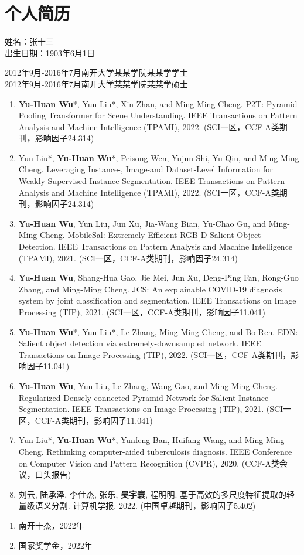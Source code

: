 

\chapter*{个人简历}

\noindent 姓名：张十三\\
出生日期：1903年6月1日\\



\noindent
2012年9月-2016年7月\quad 南开大学\quad 某某学院\quad 某某学\quad 学士 \\ 
2012年9月-2016年7月\quad 南开大学\quad 某某学院\quad 某某学\quad 硕士 \\

\begin{enumerate}
	\item \textbf{Yu-Huan Wu}*, Yun Liu*, Xin Zhan, and Ming-Ming Cheng. P2T: Pyramid Pooling Transformer for Scene Understanding. IEEE Transactions on Pattern Analysis and Machine Intelligence (TPAMI), 2022.  (SCI一区，CCF-A类期刊，影响因子24.314)
	\item Yun Liu*, \textbf{Yu-Huan Wu}*, Peisong Wen, Yujun Shi, Yu Qiu, and Ming-Ming Cheng. Leveraging Instance-, Image-and Dataset-Level Information for Weakly Supervised Instance Segmentation. IEEE Transactions on Pattern Analysis and Machine Intelligence (TPAMI), 2022. (SCI一区，CCF-A类期刊，影响因子24.314)
	\item \textbf{Yu-Huan Wu}, Yun Liu, Jun Xu, Jia-Wang Bian, Yu-Chao Gu, and Ming-Ming Cheng. MobileSal: Extremely Efficient RGB-D Salient Object Detection. IEEE Transactions on Pattern Analysis and Machine Intelligence (TPAMI), 2021.  (SCI一区，CCF-A类期刊，影响因子24.314)
	\item \textbf{Yu-Huan Wu}, Shang-Hua Gao, Jie Mei, Jun Xu, Deng-Ping Fan, Rong-Guo Zhang, and Ming-Ming Cheng. JCS: An explainable COVID-19 diagnosis system by joint classification and segmentation. IEEE Transactions on Image Processing (TIP), 2021. (SCI一区，CCF-A类期刊，影响因子11.041)
	\item \textbf{Yu-Huan Wu}*, Yun Liu*, Le Zhang, Ming-Ming Cheng, and Bo Ren. EDN: Salient object detection via extremely-downsampled network. IEEE Transactions on Image Processing (TIP), 2022. (SCI一区，CCF-A类期刊，影响因子11.041)
	\item \textbf{Yu-Huan Wu}, Yun Liu, Le Zhang, Wang Gao, and Ming-Ming Cheng. Regularized Densely-connected Pyramid Network for Salient Instance Segmentation. IEEE Transactions on Image Processing (TIP), 2021. (SCI一区，CCF-A类期刊，影响因子11.041)
	\item Yun Liu*, \textbf{Yu-Huan Wu}*, Yunfeng Ban, Huifang Wang, and Ming-Ming Cheng. Rethinking computer-aided tuberculosis diagnosis. IEEE Conference on Computer Vision and Pattern Recognition (CVPR), 2020. (CCF-A类会议，口头报告)
	\item 刘云, 陆承泽, 李仕杰, 张乐, \textbf{吴宇寰}, 程明明. 基于高效的多尺度特征提取的轻量级语义分割. 计算机学报, 2022. (中国卓越期刊，影响因子5.402)

\end{enumerate}


\begin{enumerate}
	\item 南开十杰，2022年
	\item 国家奖学金，2022年
\end{enumerate}
